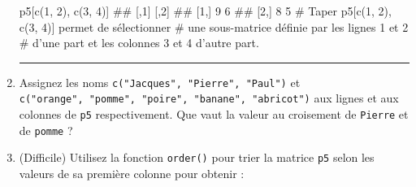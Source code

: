 \documentclass[12pt,twosided, notitlepage]{book}
\newenvironment{Shaded}{}{}
\newcommand{\CommentTok}[1]{\textcolor[rgb]{0.00,0.50,0.00}{#1}}
\newcommand{\DecValTok}[1]{#1}
\newcommand{\KeywordTok}[1]{\textcolor[rgb]{0.00,0.00,1.00}{#1}}
\newcommand{\NormalTok}[1]{#1}
\newcommand{\StringTok}[1]{\textcolor[rgb]{0.00,0.50,0.50}{#1}}
\newif \ifsol
\renewenvironment{Shaded}{\begin{snugshade}}{\end{snugshade}}
\begin{document}
\begin{enumerate}
\begin{Shaded}
\begin{Highlighting}[]
\NormalTok{p5[}\KeywordTok{c}\NormalTok{(}\DecValTok{1}\NormalTok{, }\DecValTok{2}\NormalTok{), }\KeywordTok{c}\NormalTok{(}\DecValTok{3}\NormalTok{, }\DecValTok{4}\NormalTok{)]}
\NormalTok{  ##      [,1] [,2]}
\NormalTok{  ## [1,]    9    6}
\NormalTok{  ## [2,]    8    5}
\CommentTok{# Taper p5[c(1, 2), c(3, 4)] permet de sélectionner}
\CommentTok{# une sous-matrice définie par les lignes 1 et 2}
\CommentTok{# d'une part et les colonnes 3 et 4 d'autre part.}
\end{Highlighting}
\end{Shaded}

  \begin{center} \rule{0.5\linewidth}{\linethickness}\end{center} 
    \bigskip 
    \fi
\item
  Assignez les noms \texttt{c("Jacques",\ "Pierre",\ "Paul")} et
  \texttt{c("orange",\ "pomme",\ "poire",\ "banane",\ "abricot")} aux
  lignes et aux colonnes de \texttt{p5}
  respectivement\index{\texttt{[}}. Que vaut la valeur au croisement de
  \texttt{Pierre} et de \texttt{pomme} ?

  \ifsol 

  \begin{center} \rule{0.5\linewidth}{\linethickness}\end{center}

\begin{Shaded}
\begin{Highlighting}[]
\CommentTok{# Création de p5}
\KeywordTok{rownames}\NormalTok{(p5) <-}\StringTok{ }\KeywordTok{c}\NormalTok{(}\StringTok{"Jacques"}\NormalTok{, }\StringTok{"Pierre"}\NormalTok{, }\StringTok{"Paul"}\NormalTok{)}
\KeywordTok{colnames}\NormalTok{(p5) <-}\StringTok{ }\KeywordTok{c}\NormalTok{(}\StringTok{"orange"}\NormalTok{, }\StringTok{"pomme"}\NormalTok{, }\StringTok{"poire"}\NormalTok{, }\StringTok{"banane"}\NormalTok{, }\StringTok{"abricot"}\NormalTok{)}
\NormalTok{p5}
\NormalTok{  ##         orange pomme poire banane abricot}
\NormalTok{  ## Jacques     15    12     9      6       3}
\NormalTok{  ## Pierre      14    11     8      5       2}
\NormalTok{  ## Paul        13    10     7      4       1}

\CommentTok{# Sélection des éléments demandés}
\NormalTok{p5[}\StringTok{"Pierre"}\NormalTok{, }\StringTok{"pomme"}\NormalTok{]}
\NormalTok{  ## [1] 11}
\end{Highlighting}
\end{Shaded}

  \begin{center} \rule{0.5\linewidth}{\linethickness}\end{center} 
    \bigskip 
    \fi
\item
  (Difficile) Utilisez la fonction
  \texttt{order()} pour trier la matrice
  \texttt{p5} selon les valeurs de sa première colonne pour obtenir :


\end{enumerate}
\end{document}
